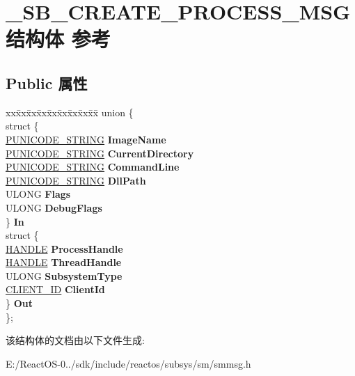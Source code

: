 \hypertarget{struct___s_b___c_r_e_a_t_e___p_r_o_c_e_s_s___m_s_g}{}\section{\+\_\+\+S\+B\+\_\+\+C\+R\+E\+A\+T\+E\+\_\+\+P\+R\+O\+C\+E\+S\+S\+\_\+\+M\+S\+G结构体 参考}
\label{struct___s_b___c_r_e_a_t_e___p_r_o_c_e_s_s___m_s_g}
\subsection*{Public 属性}
\begin{DoxyCompactItemize}
\item 
\mbox{\label{struct___s_b___c_r_e_a_t_e___p_r_o_c_e_s_s___m_s_g_aad7af151e0f0351b7a6dcd27fc3a64a3}} 
\begin{tabbing}
xx\=xx\=xx\=xx\=xx\=xx\=xx\=xx\=xx\=\kill
union \{\\
\>struct \{\\
\>\>\hyperlink{struct___u_n_i_c_o_d_e___s_t_r_i_n_g}{PUNICODE\_STRING} {\bfseries ImageName}\\
\>\>\hyperlink{struct___u_n_i_c_o_d_e___s_t_r_i_n_g}{PUNICODE\_STRING} {\bfseries CurrentDirectory}\\
\>\>\hyperlink{struct___u_n_i_c_o_d_e___s_t_r_i_n_g}{PUNICODE\_STRING} {\bfseries CommandLine}\\
\>\>\hyperlink{struct___u_n_i_c_o_d_e___s_t_r_i_n_g}{PUNICODE\_STRING} {\bfseries DllPath}\\
\>\>ULONG {\bfseries Flags}\\
\>\>ULONG {\bfseries DebugFlags}\\
\>\} {\bfseries In}\\
\>struct \{\\
\>\>\hyperlink{interfacevoid}{HANDLE} {\bfseries ProcessHandle}\\
\>\>\hyperlink{interfacevoid}{HANDLE} {\bfseries ThreadHandle}\\
\>\>ULONG {\bfseries SubsystemType}\\
\>\>\hyperlink{struct___c_l_i_e_n_t___i_d}{CLIENT\_ID} {\bfseries ClientId}\\
\>\} {\bfseries Out}\\
\}; \\

\end{tabbing}\end{DoxyCompactItemize}


该结构体的文档由以下文件生成\+:\begin{DoxyCompactItemize}
\item 
E\+:/\+React\+O\+S-\/0../sdk/include/reactos/subsys/sm/smmsg.\+h\end{DoxyCompactItemize}
